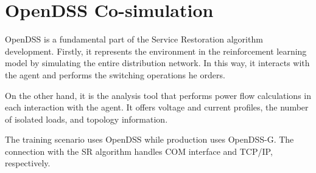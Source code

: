 \section{OpenDSS Co-simulation}
\label{ch1:sec:opendss}

OpenDSS is a fundamental part of the Service Restoration algorithm development. Firstly, it represents the environment in the reinforcement learning model by simulating the entire distribution network. In this way,  it interacts with the agent and performs the switching operations he orders. 

On the other hand, it is the analysis tool that performs power flow calculations in each interaction with the agent. It offers voltage and current profiles, the number of isolated loads, and topology information.

The training scenario uses OpenDSS while production uses OpenDSS-G. The connection with the SR algorithm handles COM interface and TCP/IP, respectively.  
